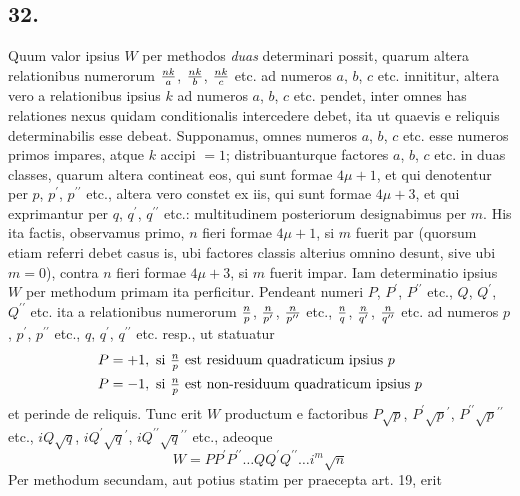 \documentclass[twoside,12pt, showframe]{memoir}
\let\oldfrac\frac
\def\frac#1#2{\mathchoice{\tfrac{#1}{#2}}{\oldfrac{#1}{#2}}{\genfrac{}{}{}{2}{#1}{#2\mathstrut}}{\genfrac{}{}{}{3}{#1}{#2\mathstrut}}}
\begin{document}
\subsection*{32.}
 
Quum valor ipsius \(W\) per methodos \textit{duas} determinari possit, quarum altera relationibus numerorum \(\frac{n k}{a}\), \(\frac{n k}{b}\), \(\frac{n k}{c}\) etc. ad numeros \(a\), \(b\), \(c\) etc. innititur, altera vero a relationibus ipsius \(k\) ad numeros \(a\), \(b\), \(c\)  etc. pendet, inter omnes has relationes nexus quidam conditionalis intercedere debet, ita ut quaevis e reliquis determinabilis esse debeat. Supponamus, omnes numeros \(a\), \(b\), \(c\) etc. esse numeros primos impares, atque \(k\) accipi \(=1\); distribuanturque factores \(a\), \(b\), \(c\)  etc. in duas classes, quarum altera contineat eos, qui sunt formae \(4 \mu+1\), et qui denotentur per \(p\), \(p^{\prime}\), \(p^{\prime \prime}\) etc., altera vero constet ex iis, qui sunt formae \(4 \mu+3\), et qui exprimantur per \(q\), \(q^{\prime}\), \(q^{\prime \prime}\) etc.: multitudinem posteriorum designabimus per \(m\). His ita factis, observamus primo, \(n\) fieri formae \(4 \mu+1\), si \(m\) fuerit par (quorsum etiam referri debet casus is, ubi factores classis alterius omnino desunt, sive ubi \(m=0\)), contra \(n\) fieri formae \(4 \mu+3\), si \(m\) fuerit impar. Iam determinatio\clearpage\noindent%
ipsius \(W\) per methodum primam ita perficitur. Pendeant numeri \(P\), \(P^{\prime}\), \(P^{\prime \prime}\) etc., \(Q\), \(Q^{\prime}\), \(Q^{\prime \prime}\) etc. ita a relationibus numerorum \(\frac{n}{p}\), \(\frac{n}{p^{\prime}}\), \(\frac{n}{p^{\prime \prime}}\) etc., \(\frac{n}{q}\), \(\frac{n}{q^{\prime}}\), \(\frac{n}{q^{\prime \prime}}\) etc. ad numeros \(p\), \(p^{\prime}\), \(p^{\prime \prime}\) etc., \(q\), \(q^{\prime}\), \(q^{\prime \prime}\) etc. resp., ut statuatur
\[\begin{aligned}
& P=+1, \text{ si } \frac{n}{p} \text{ est residuum quadraticum ipsius } p \\
& P=-1, \text{ si } \frac{n}{p} \text{ est non-residuum quadraticum ipsius } p
\end{aligned}\]
et perinde de reliquis. Tunc erit \(W\) productum e factoribus \(P \surd p\), \(P^{\prime} \surd p^{\prime}\), \(P^{\prime \prime} \surd p^{\prime \prime}\) etc., \(i Q \surd q\), \(i Q^{\prime} \surd q^{\prime}\), \(i Q^{\prime \prime} \surd q^{\prime \prime}\) etc., adeoque
\[W=P P^{\prime} P^{\prime \prime} \ldots Q Q^{\prime} Q^{\prime \prime} \ldots i^{m} \surd n\]
Per methodum secundam, aut potius statim per praecepta art. 19, erit
\end{document}
